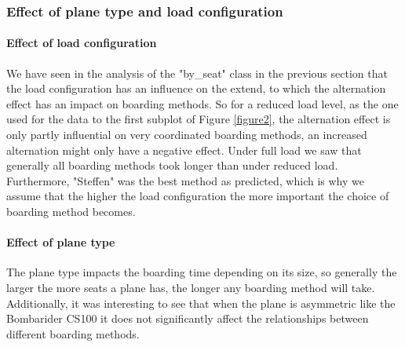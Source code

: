 \documentclass[11pt]{article}
\begin{document}
 
 
 \subsubsection{Effect of plane type and load configuration}
 \paragraph{Effect of load configuration}
 We have seen in the analysis of the "by\_seat" class in the previous section that the load configuration has an influence on the extend, to which the alternation effect has an impact on boarding methods. So for a reduced load level, as the one used for the data to the first subplot of Figure \ref{figure2}, the alternation effect is only partly influential on very coordinated boarding methods, an increased alternation might only have a negative effect. Under full load we saw that generally all boarding methods took longer than under reduced load. Furthermore, "Steffen" was the best method as predicted, which is why we assume that the higher the load configuration the more important the choice of boarding method becomes.
 
 \paragraph{Effect of plane type}
 The plane type impacts the boarding time depending on its size, so generally the larger the more seats a plane has, the longer any boarding method will take. Additionally, it was interesting to see that when the plane is asymmetric like the Bombarider CS100 it does not significantly affect the relationships between different boarding methods.
 
\end{document}
